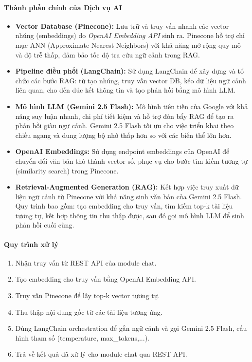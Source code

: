 \paragraph{Thành phần chính của Dịch vụ AI}
\begin{itemize}
	\item \textbf{Vector Database (Pinecone):} Lưu trữ và truy vấn nhanh các vector nhúng (embeddings) do \textit{OpenAI Embedding API} sinh ra. Pinecone hỗ trợ chỉ mục ANN (Approximate Nearest Neighbors) với khả năng mở rộng quy mô và độ trễ thấp, đảm bảo tốc độ tra cứu ngữ cảnh trong RAG.
	\item \textbf{Pipeline điều phối (LangChain):} Sử dụng LangChain để xây dựng và tổ chức các bước RAG: từ tạo nhúng, truy vấn vector DB, kéo dữ liệu ngữ cảnh liên quan, cho đến đúc kết thông tin và tạo phản hồi bằng mô hình LLM.
	\item \textbf{Mô hình LLM (Gemini 2.5 Flash):} Mô hình tiên tiến của Google với khả năng suy luận nhanh, chi phí tiết kiệm và hỗ trợ đòn bẩy RAG để tạo ra phản hồi giàu ngữ cảnh. Gemini 2.5 Flash tối ưu cho việc triển khai theo chiều ngang và dung lượng bộ nhớ thấp hơn so với các biến thể lớn hơn.
	\item \textbf{OpenAI Embeddings:} Sử dụng endpoint embeddings của OpenAI để chuyển đổi văn bản thô thành vector số, phục vụ cho bước tìm kiếm tương tự (similarity search) trong Pinecone.
	\item \textbf{Retrieval-Augmented Generation (RAG):} Kết hợp việc truy xuất dữ liệu ngữ cảnh từ Pinecone với khả năng sinh văn bản của Gemini 2.5 Flash. Quy trình bao gồm: tạo embedding cho truy vấn, tìm kiếm top-k tài liệu tương tự, kết hợp thông tin thu thập được, sau đó gọi mô hình LLM để sinh phản hồi cuối cùng.
\end{itemize}

\paragraph{Quy trình xử lý}
\begin{enumerate}
	\item Nhận truy vấn từ REST API của module chat.
	\item Tạo embedding cho truy vấn bằng OpenAI Embedding API.
	\item Truy vấn Pinecone để lấy top-k vector tương tự.
	\item Thu thập nội dung gốc từ các tài liệu tương ứng.
	\item Dùng LangChain orchestration để gắn ngữ cảnh và gọi Gemini 2.5 Flash, cấu hình tham số (temperature, max\_tokens,...).
	\item Trả về kết quả đã xử lý cho module chat qua REST API.
\end{enumerate}

